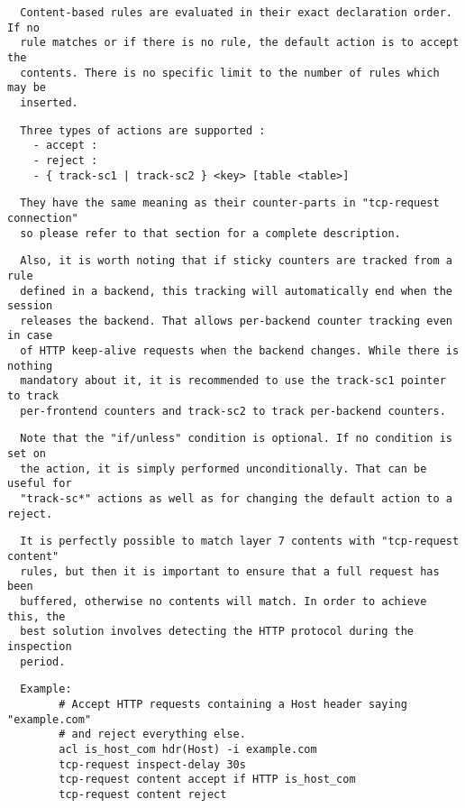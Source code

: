 \begin{verbatim}
  Content-based rules are evaluated in their exact declaration order. If no
  rule matches or if there is no rule, the default action is to accept the
  contents. There is no specific limit to the number of rules which may be
  inserted.
\end{verbatim}

\begin{verbatim}
  Three types of actions are supported :
    - accept :
    - reject :
    - { track-sc1 | track-sc2 } <key> [table <table>]
\end{verbatim}

\begin{verbatim}
  They have the same meaning as their counter-parts in "tcp-request connection"
  so please refer to that section for a complete description.
\end{verbatim}

\begin{verbatim}
  Also, it is worth noting that if sticky counters are tracked from a rule
  defined in a backend, this tracking will automatically end when the session
  releases the backend. That allows per-backend counter tracking even in case
  of HTTP keep-alive requests when the backend changes. While there is nothing
  mandatory about it, it is recommended to use the track-sc1 pointer to track
  per-frontend counters and track-sc2 to track per-backend counters.
\end{verbatim}

\begin{verbatim}
  Note that the "if/unless" condition is optional. If no condition is set on
  the action, it is simply performed unconditionally. That can be useful for
  "track-sc*" actions as well as for changing the default action to a reject.
\end{verbatim}

\begin{verbatim}
  It is perfectly possible to match layer 7 contents with "tcp-request content"
  rules, but then it is important to ensure that a full request has been
  buffered, otherwise no contents will match. In order to achieve this, the
  best solution involves detecting the HTTP protocol during the inspection
  period.
\end{verbatim}

\begin{verbatim}
  Example:
        # Accept HTTP requests containing a Host header saying "example.com"
        # and reject everything else.
        acl is_host_com hdr(Host) -i example.com
        tcp-request inspect-delay 30s
        tcp-request content accept if HTTP is_host_com
        tcp-request content reject
\end{verbatim}


